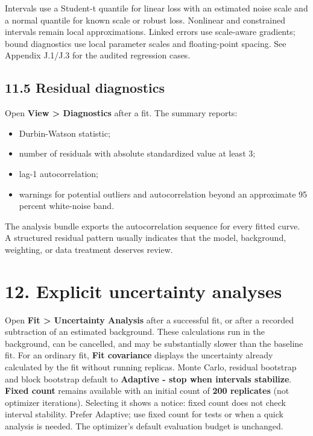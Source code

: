 \documentclass[
  10pt,
  a4paper,
  oneside]{scrreprt}
\providecommand{\tightlist}{%
  \setlength{\itemsep}{0pt}\setlength{\parskip}{0pt}}
\begin{document}
Intervals use a Student-t quantile for linear loss with an estimated
noise scale and a normal quantile for known scale or robust loss.
Nonlinear and constrained intervals remain local approximations. Linked
errors use scale-aware gradients; bound diagnostics use local parameter
scales and floating-point spacing. See Appendix J.1/J.3 for the audited
regression cases.

\hypertarget{residual-diagnostics}{%
\section{11.5 Residual diagnostics}\label{residual-diagnostics}}

Open \textbf{View \textgreater{} Diagnostics} after a fit. The summary
reports:

\begin{itemize}
\tightlist
\item
  Durbin-Watson statistic;
\item
  number of residuals with absolute standardized value at least 3;
\item
  lag-1 autocorrelation;
\item
  warnings for potential outliers and autocorrelation beyond an
  approximate 95 percent white-noise band.
\end{itemize}

The analysis bundle exports the autocorrelation sequence for every
fitted curve. A structured residual pattern usually indicates that the
model, background, weighting, or data treatment deserves review.

\hypertarget{explicit-uncertainty-analyses}{%
\chapter{12. Explicit uncertainty
analyses}\label{explicit-uncertainty-analyses}}

Open \textbf{Fit \textgreater{} Uncertainty Analysis} after a successful
fit, or after a recorded subtraction of an estimated background. These
calculations run in the background, can be cancelled, and may be
substantially slower than the baseline fit. For an ordinary fit,
\textbf{Fit covariance} displays the uncertainty already calculated by
the fit without running replicas. Monte Carlo, residual bootstrap and
block bootstrap default to \textbf{Adaptive - stop when intervals
stabilize}. \textbf{Fixed count} remains available with an initial count
of \textbf{200 replicates} (not optimizer iterations). Selecting it
shows a notice: fixed count does not check interval stability. Prefer
Adaptive; use fixed count for tests or when a quick analysis is needed.
The optimizer's default evaluation budget is unchanged.
\end{document}
